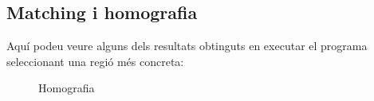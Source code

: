 	\subsection{Matching i homografia}
		Aquí podeu veure alguns dels resultats obtinguts en executar el programa seleccionant una regió més concreta:\\
		\begin{figure}[!htb]
		\end{figure}

		\begin{figure}[!htb]
			\caption{Homografia}
		\end{figure}
